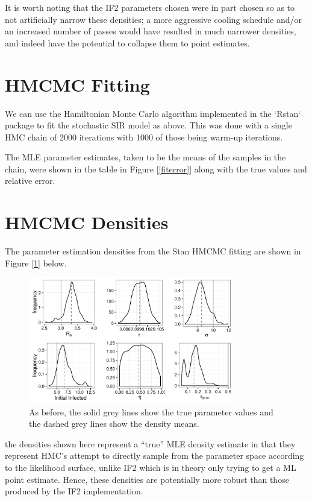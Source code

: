     It is worth noting that the IF2 parameters chosen were in part chosen so as to not artificially narrow these densities; a more aggressive cooling schedule and/or an increased number of passes would have resulted in much narrower densities, and indeed have the potential to collapse them to point estimates.


\section{HMCMC Fitting}

	We can use the Hamiltonian Monte Carlo algorithm implemented in the `Rstan` package to fit the stochastic SIR model as above. This was done with a single HMC chain of 2000 iterations with 1000 of those being warm-up iterations.

	The MLE parameter estimates, taken to be the means of the samples in the chain, were shown in the table in Figure [\ref{fiterror}] along with the true values and relative error.


\section{HMCMC Densities}

	The parameter estimation densities from the Stan HMCMC fitting are shown in Figure [\ref{hmckernels}] below.

	\begin{figure}
        \centering
        \captionsetup{width=.8\linewidth}
        \includegraphics[width=0.8\textwidth]{./images/hmckernels.pdf}
        \caption{As before, the solid grey lines show the true parameter values and the dashed grey lines show the density means. \label{hmckernels}}
    \end{figure}

    the densities shown here represent a ``true'' MLE density estimate in that they represent HMC's attempt to directly sample from the parameter space according to the likelihood surface, unlike IF2 which is in theory only trying to get a ML point estimate. Hence, these densities are potentially more robust than those produced by the IF2 implementation.


